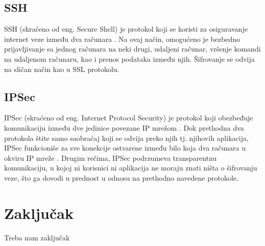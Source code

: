\documentclass[a4paper]{article}
\begin{document}
\subsection{SSH}
\label{subsec:ssh}

SSH (skraćeno od eng. Secure Shell) je protokol koji se koristi za osiguravanje internet veze između dva računara \cite{use}. Na ovaj način, omogućeno je bezbedno prijavljivanje sa jednog računara na neki drugi, udaljeni računar, vršenje komandi na udaljenom računaru, kao i prenos podataka između njih. Šifrovanje se odvija na sličan način kao u SSL protokolu.

\subsection{IPSec}
\label{subsec:ipsec}

IPSec (skraćeno od eng. Internet Protocol Security) je protokol koji obezbeđuje komunikaciju između dve jedinice povezane IP mrežom \cite{use}. Dok prethodna dva protokola štite samo saobraćaj koji se odvija preko njih tj. njihovih aplikacija, IPSec funkcioniše za sve konekcije ostvarene između bilo koja dva računara u okviru IP mreže \cite{use}. Drugim rečima, IPSec podrzumeva transparentnu komunikaciju, u kojoj ni korisnici ni aplikacija ne moraju znati ništa o šifrovanju veze, što ga dovodi u prednost u odnosu na prethodno navedene protokole.


\section{Zaključak}
\label{sec:zakljucak}

Treba nam zaključak

\appendix

\end{document}
